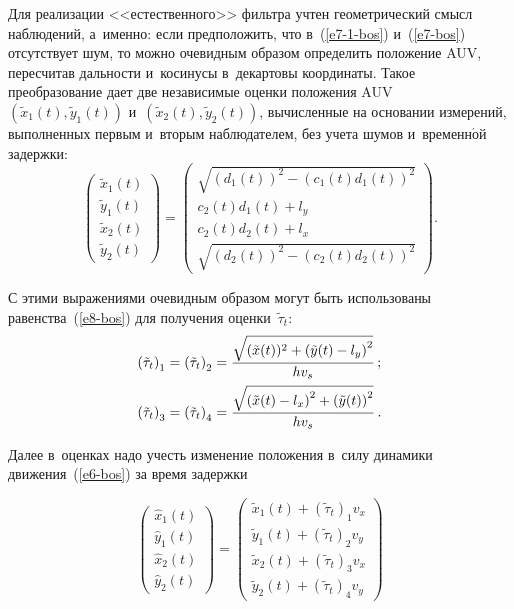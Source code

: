 \begin{multicols}{2}
     Для реализации <<естественного>> фильт\-ра учтен  
гео\-мет\-ри\-че\-ский смысл наблюдений, а~имен\-но: если предположить, 
что в~(\ref{e7-1-bos}) и~(\ref{e7-bos}) отсутствует шум, то мож\-но оче\-вид\-ным образом 
определить положение AUV, пе\-ре\-счи\-тав дальности и~косинусы в~декартовы 
координаты. Такое преобразование дает две независимые оцен\-ки положения 
AUV $\left( \tilde{x}_1(t),\tilde{y}_1(t)\right)$ и~$\left( \tilde{x}_2(t), 
\tilde{y}_2(t)\right)$, вы\-чис\-лен\-ные на основании измерений, выполненных 
первым и~вторым наблюдателем, без учета шумов и~временн$\acute{\mbox{о}}$й за\-держки:
     $$
     \begin{pmatrix}
     \tilde{x}_1(t)\\[3pt]
      \tilde{y}_1(t)\\[3pt]
      \tilde{x}_2(t)\\[3pt] 
      \tilde{y}_2(t)
     \end{pmatrix} = 
     \begin{pmatrix}
     \sqrt{(d_1(t))^2 -(c_1(t)d_1(t))^2}\\[3pt]
     c_2(t)d_1(t)+l_y\\[3pt]
     c_2(t) d_2(t)+l_x\\[3pt]
     \sqrt{(d_2(t))^2 -(c_2(t) d_2(t))^2}
     \end{pmatrix}.
     $$
     
     \noindent
     С этими выражениями очевидным образом могут быть использованы 
равенства~(\ref{e8-bos}) для получения оцен\-ки~$\tilde{\tau}_t$:
     \begin{align*}
     \left( \tilde{\tau}_t\right)_1 &= \left( \tilde{\tau}_t\right)_2 
=\displaystyle\frac{\displaystyle \sqrt{(\tilde{x}(t))^2+\left(\tilde{y}(t)-l_y\right)^2}\mathstrut}{\displaystyle hv_s\mathstrut}\,;\\
     \left( \tilde{\tau}_t\right)_3 &= \left( \tilde{\tau}_t\right)_4 
=\displaystyle\frac{\displaystyle \sqrt{\left(\tilde{x}(t)-l_x\right)^2 +\left(\tilde{y}(t)\right)^2}\mathstrut}{\displaystyle hv_s\mathstrut}\,.
     \end{align*}
     
     Далее в~оценках надо учесть изменение положения в~силу динамики 
движения~(\ref{e6-bos}) за время за\-держки

\vspace*{-3pt}

\noindent
     $$
     \begin{pmatrix}
     \hat{x}_1(t)\\[3pt]
     \hat{y}_1(t)\\[3pt]
     \hat{x}_2(t)\\[3pt]
      \hat{y}_2(t)
     \end{pmatrix}= \begin{pmatrix}
     \tilde{x}_1(t)+\left( \tilde{\tau}_t\right)_1 v_x\\[3pt]
     \tilde{y}_1(t)+\left( \tilde{\tau}_t\right)_2 v_y\\[3pt]
     \tilde{x}_2(t)+\left( \tilde{\tau}_t\right)_3 v_x\\[3pt]
     \tilde{y}_2(t)+\left( \tilde{\tau}_t\right)_4 v_y
     \end{pmatrix}
     $$
     

\end{multicols}

